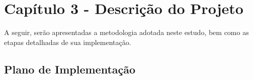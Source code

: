 
\chapter{Capítulo 3 - Descrição do Projeto}

A seguir, serão apresentadas a metodologia adotada neste estudo, bem como as etapas detalhadas de sua implementação.

\section{Plano de Implementação}

